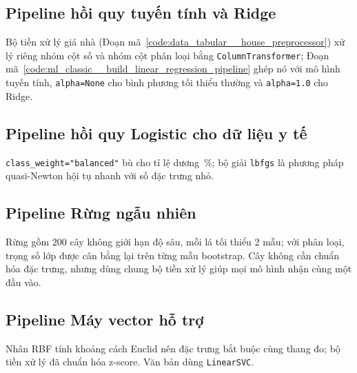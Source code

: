 \subsection{Pipeline hồi quy tuyến tính và Ridge}

Bộ tiền xử lý giá nhà (Đoạn mã~\ref{code:data_tabular__house_preprocessor}) xử lý riêng nhóm cột số và nhóm cột phân loại
bằng \texttt{ColumnTransformer}; Đoạn mã~\ref{code:ml_classic__build_linear_regression_pipeline} ghép nó với mô hình
tuyến tính, \texttt{alpha=None} cho bình phương tối thiểu thường và \texttt{alpha=1.0} cho Ridge.


\subsection{Pipeline hồi quy Logistic cho dữ liệu y tế}

\texttt{class\_weight="balanced"} bù cho tỉ lệ dương \,\%; bộ giải \texttt{lbfgs} là phương
pháp quasi-Newton hội tụ nhanh với số đặc trưng nhỏ.


\subsection{Pipeline Rừng ngẫu nhiên}

Rừng gồm 200 cây không giới hạn độ sâu, mỗi lá tối thiểu 2 mẫu; với phân loại, trọng số lớp được cân bằng lại trên từng
mẫu bootstrap. Cây không cần chuẩn hóa đặc trưng, nhưng dùng chung bộ tiền xử lý giúp mọi mô hình nhận cùng một đầu vào.


\subsection{Pipeline Máy vector hỗ trợ}

Nhân RBF tính khoảng cách Euclid nên đặc trưng bắt buộc cùng thang đo; bộ tiền xử lý đã chuẩn hóa z-score. Văn bản dùng
\texttt{LinearSVC}.

